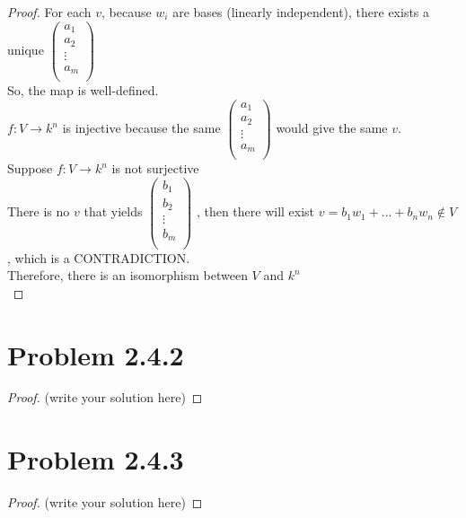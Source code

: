 \documentclass[12pt]{article}
\begin{document}
\begin{proof}
	For each $v$, because $w_i$ are bases (linearly independent), there exists a unique $\begin{pmatrix}
  a_{1} \\
  a_{2} \\
  \vdots \\
  a_{m} \\
\end{pmatrix}$
\\ So, the map is well-defined.
\\ $f: V \rightarrow k^n$ is injective because the same
$\begin{pmatrix}
  a_{1} \\
  a_{2} \\
  \vdots \\
  a_{m} \\
\end{pmatrix}$
would give the same $v$.
\\Suppose $f: V \rightarrow k^n$ is not surjective
\\There is no $v$ that yields $\begin{pmatrix}
  b_{1} \\
  b_{2} \\
  \vdots \\
  b_{m} \\
\end{pmatrix}$
, then there will exist $v=b_1w_1+...+b_nw_n \notin V$, which is a CONTRADICTION.
\\Therefore, there is an isomorphism between $V$ and $k^n$
\\
\end{proof}

\newpage 

\section{Problem 2.4.2}

\begin{proof}
	(write your solution here)
\end{proof}

\newpage 

\section{Problem 2.4.3}

\begin{proof}
	(write your solution here)
\end{proof}
\end{document}
